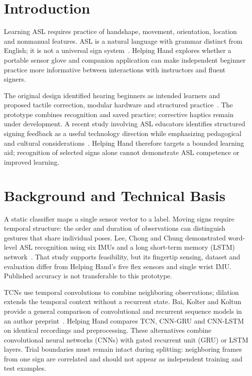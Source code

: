 \documentclass[11pt,letterpaper]{article}
\begin{document}
\section{Introduction}
Learning ASL requires practice of handshape, movement, orientation, location
and nonmanual features. ASL is a natural language with grammar distinct from
English; it is not a universal sign system~\cite{nidcd}. Helping Hand explores whether a portable sensor
glove and companion application can make independent beginner practice more
informative between interactions with instructors and fluent signers.

The original design identified hearing beginners as intended learners and
proposed tactile correction, modular hardware and structured practice~\cite{design}.
The prototype combines recognition and saved practice; corrective haptics remain
under development.
A recent study involving ASL educators identifies structured signing feedback
as a useful technology direction while emphasizing pedagogical and cultural
considerations~\cite{educators}. Helping Hand therefore targets a bounded
learning aid; recognition of selected signs alone cannot demonstrate ASL
competence or improved learning.

\section{Background and Technical Basis}
A static classifier maps a single sensor vector to a label. Moving signs
require temporal structure: the order and duration of observations can
distinguish gestures that share individual poses. Lee, Chong and Chung
demonstrated word-level ASL recognition using six IMUs and a long short-term
memory (LSTM) network~\cite{lee}. That study supports feasibility, but its fingertip sensing,
dataset and evaluation differ from Helping Hand's five flex sensors and single
wrist IMU. Published accuracy is not transferable to this prototype.

TCNs use temporal convolutions to combine neighboring observations; dilation
extends the temporal context without a recurrent state. Bai, Kolter and Koltun
provide a general comparison of convolutional and recurrent sequence models
in an author preprint~\cite{tcn}. Helping Hand compares TCN, CNN-GRU and
CNN-LSTM on identical recordings and preprocessing. These alternatives combine
convolutional neural networks (CNNs) with gated recurrent unit (GRU) or LSTM
layers. Trial boundaries must remain intact during splitting:
neighboring frames from one sign are correlated and should not appear as
independent training and test examples.
\end{document}
